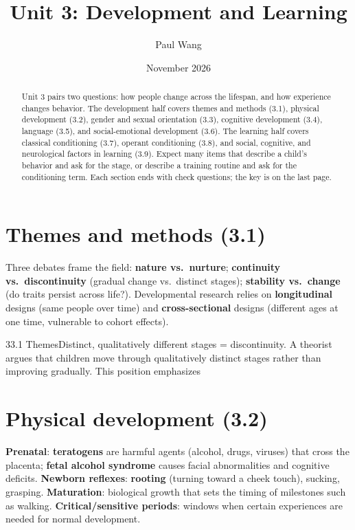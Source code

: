 \documentclass[11pt]{article}
\title{Unit 3: Development and Learning}
\author{Paul Wang}
\date{November 2026}
\begin{document}
\maketitle

\begin{abstract}
Unit 3 pairs two questions: how people change across the lifespan, and how experience changes behavior. The development half covers themes and methods (3.1), physical development (3.2), gender and sexual orientation (3.3), cognitive development (3.4), language (3.5), and social-emotional development (3.6). The learning half covers classical conditioning (3.7), operant conditioning (3.8), and social, cognitive, and neurological factors in learning (3.9). Expect many items that describe a child's behavior and ask for the stage, or describe a training routine and ask for the conditioning term. Each section ends with check questions; the key is on the last page.
\end{abstract}


\section{Themes and methods (3.1)}

Three debates frame the field: \textbf{nature vs.\ nurture}; \textbf{continuity vs.\ discontinuity} (gradual change vs.\ distinct stages); \textbf{stability vs.\ change} (do traits persist across life?). Developmental research relies on \textbf{longitudinal} designs (same people over time) and \textbf{cross-sectional} designs (different ages at one time, vulnerable to cohort effects).

\begin{q}{3}{3.1 Themes}{Distinct, qualitatively different stages = discontinuity.}
A theorist argues that children move through qualitatively distinct stages rather than improving gradually. This position emphasizes
\end{q}

\section{Physical development (3.2)}

\textbf{Prenatal}: \textbf{teratogens} are harmful agents (alcohol, drugs, viruses) that cross the placenta; \textbf{fetal alcohol syndrome} causes facial abnormalities and cognitive deficits. \textbf{Newborn reflexes}: \textbf{rooting} (turning toward a cheek touch), sucking, grasping. \textbf{Maturation}: biological growth that sets the timing of milestones such as walking. \textbf{Critical/sensitive periods}: windows when certain experiences are needed for normal development.
\end{document}
